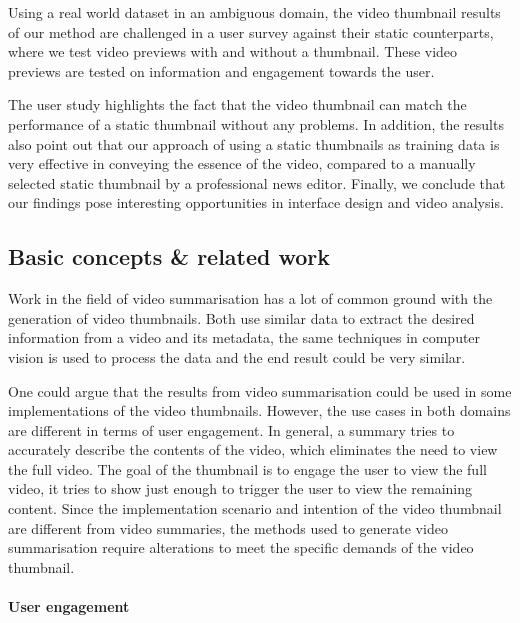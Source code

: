 \documentclass{../resources/sig-alternate-05-2015}
\begin{document}
Using a real world dataset in an ambiguous domain, the video thumbnail results of our method are challenged in a user survey against their static counterparts, where we test video previews with and without a thumbnail. These video previews are tested on information and engagement towards the user.

The user study highlights the fact that the video thumbnail can match the performance of a static thumbnail without any problems. In addition, the results also point out that our approach of using a static thumbnails as training data is very effective in conveying the essence of the video, compared to a manually selected static thumbnail by a professional news editor. Finally, we conclude that our findings pose interesting opportunities in interface design and video analysis.

\subsection{Basic concepts \& related work}

\label{related work}

Work in the field of video summarisation has a lot of common ground with the generation of video thumbnails. Both use similar data to extract the desired information from a video and its metadata, the same techniques in computer vision is used to process the data and the end result could be very similar. 

One could argue that the results from video summarisation could be used in some implementations of the video thumbnails. However, the use cases in both domains are different in terms of user engagement. In general, a summary tries to accurately describe the contents of the video, which eliminates the need to view the full video. The goal of the thumbnail is to engage the user to view the full video, it tries to show just enough to trigger the user to view the remaining content. Since the implementation scenario and intention of the video thumbnail are different from video summaries, the methods used to generate video summarisation require alterations to meet the specific demands of the video thumbnail.

\paragraph{User engagement}
\label{section: user engagement}
\end{document}
